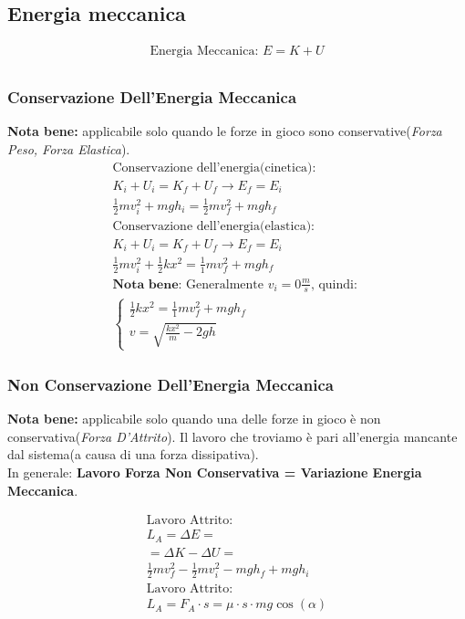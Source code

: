 \subsection{Energia meccanica}

\begin{gather*}
    \text{Energia Meccanica: } E = K + U \\
\end{gather*}
\subsubsection{Conservazione Dell'Energia Meccanica}
\textbf{Nota bene: } applicabile solo quando le forze in gioco sono conservative(\textit{Forza Peso, Forza Elastica}).
\begin{gather*}
    \text{Conservazione dell'energia(cinetica): } \\ K_i + U_i = K_f + U_f \rightarrow E_f = E_i \\ \frac{1}{2} m v_i^2 + mgh_i = \frac{1}{2} mv_f^2 + mgh_f \\
    \text{Conservazione dell'energia(elastica): } \\ K_i + U_i = K_f + U_f \rightarrow E_f = E_i \\ \frac{1}{2} m v_i^2 + \frac{1}{2}kx^2 = \frac{1}{1}mv_f^2 + mgh_f \\
    \textbf{Nota bene: }\text{Generalmente $v_i = 0 \frac{m}{s}$, quindi: } \\
    \begin{cases}
        \frac{1}{2}kx^2 = \frac{1}{1}mv_f^2 + mgh_f \\
        v = \sqrt{\frac{k x^2}{m} - 2gh}
    \end{cases}
\end{gather*}

\subsubsection{Non Conservazione Dell'Energia Meccanica}

\textbf{Nota bene: } applicabile solo quando una delle forze in gioco è non conservativa(\textit{Forza D'Attrito}). Il lavoro che troviamo è pari all'energia mancante dal sistema(a causa di una forza dissipativa). \\
In generale: \textbf{Lavoro Forza Non Conservativa = Variazione Energia Meccanica}.

\begin{gather*}
    \text{Lavoro Attrito: } \\ L_A = \Delta E = \\ = \Delta K - \Delta U = \\ \frac{1}{2} m v_f^2 - \frac{1}{2} m v_i^2 - mgh_f + mgh_i \\
    \text{Lavoro Attrito: } \\ L_A = F_{A} \cdot s = \mu \cdot s \cdot m g \cos (\alpha)
\end{gather*}